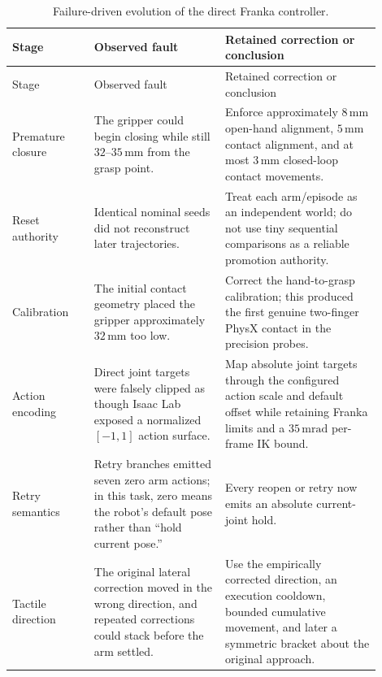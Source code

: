 \begin{longtable}{>{\raggedright\arraybackslash}p{0.20\linewidth}
                  >{\raggedright\arraybackslash}p{0.32\linewidth}
                  >{\raggedright\arraybackslash}p{0.38\linewidth}}
\caption{Failure-driven evolution of the direct Franka controller.}
\label{tab:franka-controller-evolution}\\
\toprule
Stage & Observed fault & Retained correction or conclusion \\
\midrule
\endfirsthead
\toprule
Stage & Observed fault & Retained correction or conclusion \\
\midrule
\endhead
Premature closure & The gripper could begin closing while still
$32$--$35\,\mathrm{mm}$ from the grasp point. & Enforce approximately
$8\,\mathrm{mm}$ open-hand alignment, $5\,\mathrm{mm}$ contact alignment,
and at most $3\,\mathrm{mm}$ closed-loop contact movements. \\

Reset authority & Identical nominal seeds did not reconstruct later
trajectories. & Treat each arm/episode as an independent world; do not use
tiny sequential comparisons as a reliable promotion authority. \\

Calibration & The initial contact geometry placed the gripper approximately
$32\,\mathrm{mm}$ too low. & Correct the hand-to-grasp calibration; this
produced the first genuine two-finger PhysX contact in the precision probes. \\

Action encoding & Direct joint targets were falsely clipped as though Isaac
Lab exposed a normalized $[-1,1]$ action surface. & Map absolute joint targets
through the configured action scale and default offset while retaining Franka
limits and a $35\,\mathrm{mrad}$ per-frame IK bound. \\

Retry semantics & Retry branches emitted seven zero arm actions; in this task,
zero means the robot's default pose rather than ``hold current pose.'' & Every
reopen or retry now emits an absolute current-joint hold. \\

Tactile direction & The original lateral correction moved in the wrong
direction, and repeated corrections could stack before the arm settled. & Use
the empirically corrected direction, an execution cooldown, bounded cumulative
movement, and later a symmetric bracket about the original approach. \\


\end{longtable}
